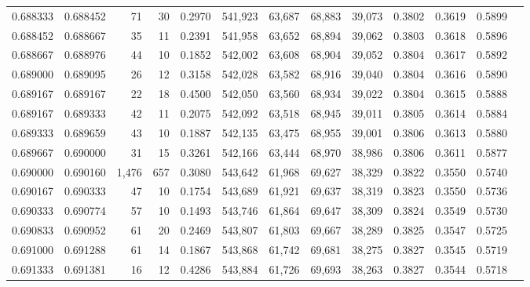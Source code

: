 \begin{tabular}{rrrrrrrrrrrrr}
0.688333 & 0.688452 &    71 &  30 &                                     0.2970 & 541,923 &  63,687 &  68,883 &  39,073 & 0.3802 & 0.3619 & 0.5899 \\
0.688452 & 0.688667 &    35 &  11 &                                     0.2391 & 541,958 &  63,652 &  68,894 &  39,062 & 0.3803 & 0.3618 & 0.5896 \\
0.688667 & 0.688976 &    44 &  10 &                                     0.1852 & 542,002 &  63,608 &  68,904 &  39,052 & 0.3804 & 0.3617 & 0.5892 \\
0.689000 & 0.689095 &    26 &  12 &                                     0.3158 & 542,028 &  63,582 &  68,916 &  39,040 & 0.3804 & 0.3616 & 0.5890 \\
0.689167 & 0.689167 &    22 &  18 &                                     0.4500 & 542,050 &  63,560 &  68,934 &  39,022 & 0.3804 & 0.3615 & 0.5888 \\
0.689167 & 0.689333 &    42 &  11 &                                     0.2075 & 542,092 &  63,518 &  68,945 &  39,011 & 0.3805 & 0.3614 & 0.5884 \\
0.689333 & 0.689659 &    43 &  10 &                                     0.1887 & 542,135 &  63,475 &  68,955 &  39,001 & 0.3806 & 0.3613 & 0.5880 \\
0.689667 & 0.690000 &    31 &  15 &                                     0.3261 & 542,166 &  63,444 &  68,970 &  38,986 & 0.3806 & 0.3611 & 0.5877 \\
0.690000 & 0.690160 & 1,476 & 657 &                                     0.3080 & 543,642 &  61,968 &  69,627 &  38,329 & 0.3822 & 0.3550 & 0.5740 \\
0.690167 & 0.690333 &    47 &  10 &                                     0.1754 & 543,689 &  61,921 &  69,637 &  38,319 & 0.3823 & 0.3550 & 0.5736 \\
0.690333 & 0.690774 &    57 &  10 &                                     0.1493 & 543,746 &  61,864 &  69,647 &  38,309 & 0.3824 & 0.3549 & 0.5730 \\
0.690833 & 0.690952 &    61 &  20 &                                     0.2469 & 543,807 &  61,803 &  69,667 &  38,289 & 0.3825 & 0.3547 & 0.5725 \\
0.691000 & 0.691288 &    61 &  14 &                                     0.1867 & 543,868 &  61,742 &  69,681 &  38,275 & 0.3827 & 0.3545 & 0.5719 \\
0.691333 & 0.691381 &    16 &  12 &                                     0.4286 & 543,884 &  61,726 &  69,693 &  38,263 & 0.3827 & 0.3544 & 0.5718 \\

\end{tabular}
